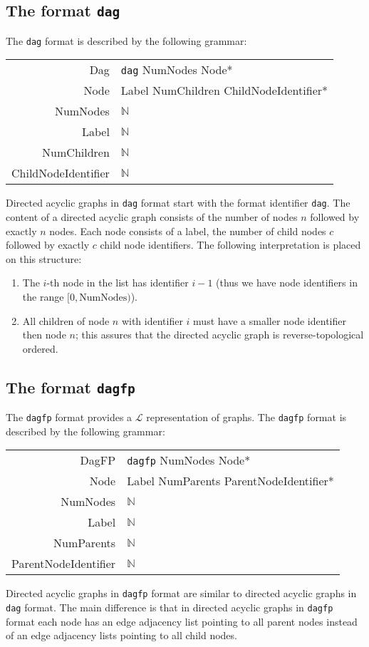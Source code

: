 \documentclass{article}
\makeatletter
\newenvironment{grammar}{\begin{tabular}{r@{ $~\longleftarrow~$ }l}}{\end{tabular}}
\newcommand{\grammarrule}[2]{#1&#2\\}
\newcommand{\List}{\mathcal{L}}
\makeatother
\begin{document}
\subsection{The format {\tt dag}}
The {\tt dag} format is described by the following grammar:

\begin{grammar}
\grammarrule{Dag}{{\tt dag} NumNodes Node*}
\grammarrule{Node}{Label NumChildren ChildNodeIdentifier*}
\grammarrule{NumNodes}{$\mathbb{N}$}
\grammarrule{Label}{$\mathbb{N}$}
\grammarrule{NumChildren}{$\mathbb{N}$}
\grammarrule{ChildNodeIdentifier}{$\mathbb{N}$}
\end{grammar}

Directed acyclic graphs in {\tt dag} format start with the format identifier {\tt dag}. The content of a directed acyclic graph consists of the number of nodes $n$ followed by exactly $n$ nodes. Each node consists of a label, the number of child nodes $c$ followed by exactly $c$ child node identifiers. The following interpretation is placed on this structure:

\begin{enumerate}
    \item The $i$-th node in the list has identifier $i-1$ (thus we have node identifiers in the range $[0, \mathrm{NumNodes})$).
    \item All children of node $n$ with identifier $i$ must have a smaller node identifier then node $n$; this assures that the directed acyclic graph is reverse-topological ordered.
\end{enumerate}

\subsection{The format {\tt dagfp}}
The {\tt dagfp} format provides a $\List$ representation of graphs. The {\tt dagfp} format is described by the following grammar:

\begin{grammar}
\grammarrule{DagFP}{{\tt dagfp} NumNodes Node*}
\grammarrule{Node}{Label NumParents ParentNodeIdentifier*}
\grammarrule{NumNodes}{$\mathbb{N}$}
\grammarrule{Label}{$\mathbb{N}$}
\grammarrule{NumParents}{$\mathbb{N}$}
\grammarrule{ParentNodeIdentifier}{$\mathbb{N}$}
\end{grammar}

Directed acyclic graphs in {\tt dagfp} format are similar to directed acyclic graphs in {\tt dag} format. The main difference is that in directed acyclic graphs in {\tt dagfp} format each node has an edge adjacency list pointing to all parent nodes instead of an edge adjacency lists pointing to all child nodes.
\end{document}
